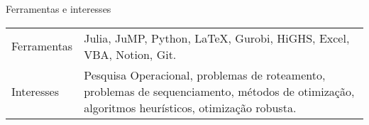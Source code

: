 \documentclass{resume} %
\begin{document}
\begin{rSection}{Ferramentas e interesses}
    \begin{tabularx}{\textwidth}{lX}
        Ferramentas & Julia, JuMP, Python, \LaTeX, Gurobi, HiGHS, Excel, VBA, Notion, Git.\\
        Interesses  & Pesquisa Operacional, problemas de roteamento, problemas de sequenciamento, métodos de otimização, algoritmos heurísticos, otimização robusta.
    \end{tabularx}
\end{rSection}
\end{document}
